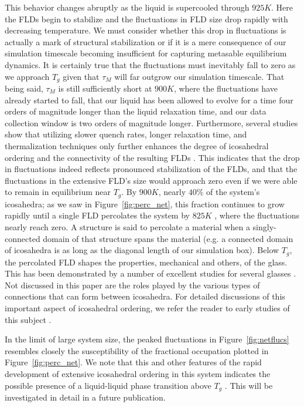 \documentclass[aps,prl,preprint,showpacs,amsmath,floatfix,superscriptaddress]{revtex4}
\begin{document}
This behavior changes abruptly as the liquid is supercooled
through $925K$. Here the FLDs begin to stabilize and the
fluctuations in FLD size drop rapidly with decreasing temperature.
We must consider whether this drop in fluctuations is actually a
mark of structural stabilization or if it is a mere consequence of
our simulation timescale becoming insufficient for capturing
metasable equilibrium dynamics. It is certainly true that the
fluctuations must inevitably fall to zero as we approach $T_{g}$
given that $\tau_{M}$ will far outgrow our simulation timescale.
That being said, $\tau_{M}$ is still sufficiently short at $900K$,
where the fluctuations have already started to fall, that our
liquid has been allowed to evolve for a time four orders of
magnitude longer than the liquid relaxation time, and our data
collection window is two orders of magnitude longer. Furthermore,
several studies show that utilizing slower quench rates, longer
relaxation time, and thermalization techniques only further
enhances the degree of icosahedral ordering and the connectivity
of the resulting FLDs \cite{Ding2014,Mendelev2015}. This indicates
that the drop in fluctuations indeed reflects pronounced
stabilization of the FLDs, and that the fluctuations in the
extensive FLD's size would approach zero even if we were able to
remain in equilibrium near $T_{g}$. By $900K$, nearly $40\%$ of
the system's icosahedra; as we saw in Figure~\ref{fig:perc_net},
this fraction continues to grow rapidly until a single FLD
percolates the system by $825K$ \cite{Soklaski2013}, 
where the fluctuations nearly
reach zero. A structure is said to percolate a 
material when a singly-connected domain of that structure spans the material
(e.g. a connected domain of icosahedra is as long as the diagonal
length of our simulation box). Below $T_{g}$, the percolated FLD shapes the
properties, mechanical and others, of the glass. This has been
demonstrated by a number of excellent studies for several glasses
\cite{Baumer2013, Wu2013, Lee2011, Zhang2014, Wakeda2010, Liu2014,
Wang2014}. Not discussed in this paper are the roles played by the various 
types of connections that can form between icosahedra. For detailed discussions 
of this important aspect of icosahedral ordering, we refer the reader to early studies 
of this subject \cite{Soklaski2013, Ding2014}.

In the limit of large system size, the peaked fluctuations in
Figure~\ref{fig:netflucs} resembles closely the susceptibility
of the fractional occupation plotted in Figure~\ref{fig:perc_net}.
We note that this and other features of the rapid development of extensive
icosahedral ordering in this system indicates the possible
presence of a liquid-liquid phase transition above $T_{g}$
\cite{Tanaka2000}. This will be investigated in detail in a future
publication.
\end{document}
